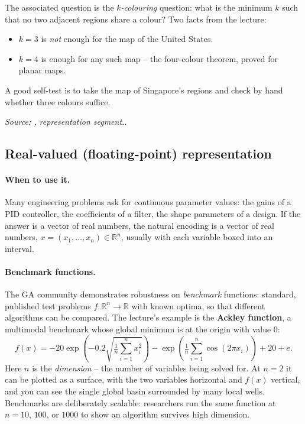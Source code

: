 \documentclass[11pt,a4paper]{article}
\newcommand{\R}{\mathbb{R}}
\newcommand{\source}[1]{\par\smallskip\noindent\textit{Source: #1.}\par\smallskip}
\begin{document}
The associated question is the \emph{$k$-colouring} question: what is the
minimum $k$ such that no two adjacent regions share a colour? Two facts from
the lecture:
\begin{itemize}
\item $k=3$ is \emph{not} enough for the map of the United States.
\item $k=4$ is enough for any such map -- the four-colour theorem, proved for
      planar maps.
\end{itemize}
A good self-test is to take the map of Singapore's regions and check by hand
whether three colours suffice.
\source{, representation segment.}

\subsection{Real-valued (floating-point) representation}

\paragraph{When to use it.}
Many engineering problems ask for continuous parameter values: the gains of a
PID controller, the coefficients of a filter, the shape parameters of a
design. If the answer is a vector of real numbers, the natural encoding is a
vector of real numbers, $x=(x_1,\ldots,x_n)\in\R^n$, usually with each
variable boxed into an interval.

\paragraph{Benchmark functions.}
The GA community demonstrates robustness on \emph{benchmark} functions:
standard, published test problems $f:\R^n\to\R$ with known optima, so that
different algorithms can be compared. The lecture's example is the
\textbf{Ackley function}, a multimodal benchmark whose global minimum is at
the origin with value $0$:
\[
  f(x)=-20\exp\!\left(-0.2\sqrt{\tfrac1n\textstyle\sum_{i=1}^{n}x_i^{2}}\right)
       -\exp\!\left(\tfrac1n\textstyle\sum_{i=1}^{n}\cos(2\pi x_i)\right)
       +20+e .
\]
Here $n$ is the \emph{dimension} -- the number of variables being solved for.
At $n=2$ it can be plotted as a surface, with the two variables horizontal
and $f(x)$ vertical, and you can see the single global basin surrounded by
many local wells. Benchmarks are deliberately scalable: researchers run the
same function at $n=10$, $100$, or $1000$ to show an algorithm survives high
dimension.
\end{document}

